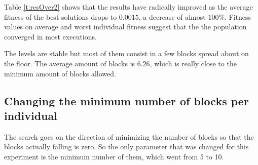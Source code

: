 \documentclass[sigconf]{acmart}
\begin{document}
Table \ref{t:resOver2} shows that the results have radically improved as the 
average fitness of the best solutions drops to $0.0015$, a decrease of almost 
100\%. Fitness values on average and worst individual fitness suggest that the
the population converged in most executions. 

The levels are stable but 
most of them consist in a 
few blocks spread about on the floor.
The average amount of blocks is $6.26$, 
which is really close to the minimum amount of blocks allowed.


\subsection{Changing the minimum number of blocks per individual}\label{E4}
The search goes on the direction
of minimizing the number of blocks so that the blocks
actually falling is zero.
So the only parameter that was changed for this experiment is the minimum
number of them, which went from 5 to 10. 
\end{document}
